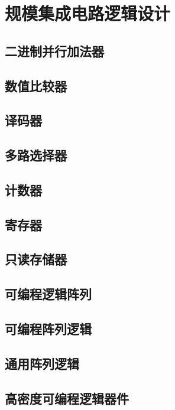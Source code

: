 \chapter{规模集成电路逻辑设计}
\newpage

\section{二进制并行加法器}

\section{数值比较器}

\section{译码器}

\section{多路选择器}

\section{计数器}

\section{寄存器}

\section{只读存储器}

\section{可编程逻辑阵列}

\section{可编程阵列逻辑}

\section{通用阵列逻辑}

\section{高密度可编程逻辑器件}

\newpage
